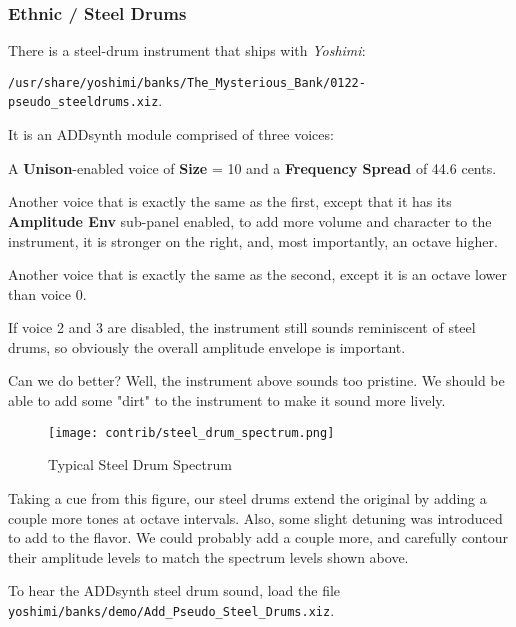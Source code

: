 \subsubsection{Ethnic / Steel Drums}
\label{subsubsec:cookbook_instruments_ethnic_steeldrums}

   There is a steel-drum instrument that ships with \textsl{Yoshimi}:

   \texttt{/usr/share/yoshimi/banks/The\_Mysterious\_Bank/0122-pseudo\_steeldrums.xiz}.

   It is an ADDsynth module comprised of three voices:

   \begin{enumber}
      \item A \textbf{Unison}-enabled voice of \textbf{Size} = 10 and a
         \textbf{Frequency Spread} of 44.6 cents.
      \item Another voice that is exactly the same as the first, except that
         it has its \textbf{Amplitude Env} sub-panel enabled, to add more
         volume and character to the instrument, it is stronger on the
         right, and, most importantly, an octave higher.
      \item Another voice that is exactly the same as the second, 
         except it is an octave lower than voice 0.
   \end{enumber}

   If voice 2 and 3 are disabled, the instrument still sounds reminiscent of
   steel drums, so obviously the overall amplitude envelope is important.

   Can we do better?  Well, the instrument above sounds too pristine.
   We should be able to add some "dirt" to the instrument to make it sound
   more lively.

\begin{figure}[H]
   \centering 
   \texttt{[image: contrib/steel\_drum\_spectrum.png]}
   \caption{Typical Steel Drum Spectrum}
   \label{fig:cookbook_bank_steeldrum_spectrum}
\end{figure}

   Taking a cue from this figure, our steel drums extend the original
   by adding a couple more tones at octave intervals.  Also, some slight
   detuning was introduced to add to the flavor.
   We could probably add a couple more, and carefully contour their
   amplitude levels to match the spectrum levels shown above.

   To hear the ADDsynth steel drum sound, load the file
   \texttt{yoshimi/banks/demo/Add\_Pseudo\_Steel\_Drums.xiz}.


